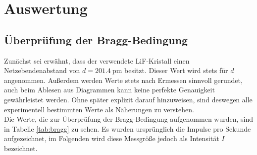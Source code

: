 \section{Auswertung}
\label{sec:Auswertung}
\subsection{Überprüfung der Bragg-Bedingung}
\label{subsec:bragg}
Zunächst sei erwähnt, dass der verwendete LiF-Kristall einen Netzebendenabstand von
$d = \SI{201.4}{\pico\meter}$ besitzt. Dieser Wert wird stets für $d$ angenommen.
Außerdem werden Werte stets nach Ermessen sinnvoll gerundet, auch beim Ablesen aus
Diagrammen kann keine perfekte Genauigkeit gewährleistet werden. Ohne später
explizit darauf hinzuweisen, sind deswegen alle experimentell bestimmten Werte als Näherungen zu verstehen.\\
Die Werte, die zur Überprüfung der Bragg-Bedingung aufgenommen wurden, sind in Tabelle
\ref{tab:bragg} zu sehen. Es wurden ursprünglich die Impulse pro Sekunde aufgezeichnet,
im Folgenden wird diese Messgröße jedoch als Intensität $I$ bezeichnet.

